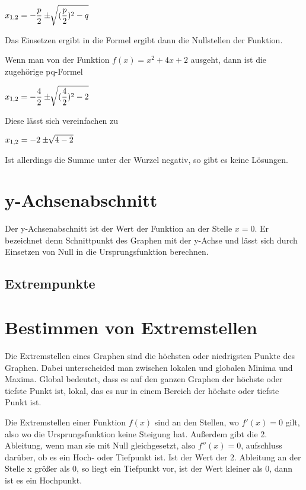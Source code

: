 $\mathlarger{x_{1,2} = -\frac{p}{2} \pm \sqrt[]{(\frac{p}{2})^2 - q}}$ \newline

Das Einsetzen ergibt in die Formel ergibt dann die Nullstellen der Funktion.

Wenn man von der Funktion $f(x) = x^2 + 4x + 2$ ausgeht, dann ist die zugehörige pq-Formel \newline

$\mathlarger{x_{1,2} = -\frac{4}{2} \pm \sqrt[]{(\frac{4}{2})^2 - 2}}$ \newline

Diese lässt sich vereinfachen zu \newline

$\mathlarger{x_{1,2} = -2 \pm \sqrt[]{4 - 2}}$

Ist allerdings die Summe unter der Wurzel negativ, so gibt es keine Lösungen.

\section*{y-Achsenabschnitt}

Der y-Achsenabschnitt ist der Wert der Funktion an der Stelle $x = 0$.
Er bezeichnet denn Schnittpunkt des Graphen mit der y-Achse und lässt sich
durch Einsetzen von Null in die Ursprungsfunktion berechnen. 

\subsection{Extrempunkte}

\section*{Bestimmen von Extremstellen}
Die Extremstellen eines Graphen sind die höchsten oder niedrigsten Punkte des Graphen.
Dabei unterscheided man zwischen lokalen und globalen Minima und Maxima. Global bedeutet,
dass es auf den ganzen Graphen der höchste oder tiefste Punkt ist, lokal, das es nur in einem Bereich
der höchste oder tiefste Punkt ist.
\newline

Die Extremstellen einer Funktion $f(x)$ sind an den Stellen, wo $f'(x) = 0$ gilt, also wo
die Ursprungsfunktion keine Steigung hat. Außerdem gibt die 2. Ableitung, wenn man sie mit Null
gleichgesetzt, also $f''(x) = 0$, aufschluss darüber, ob es ein Hoch- oder Tiefpunkt ist.
Ist der Wert der 2. Ableitung an der Stelle x größer als $0$, so liegt ein Tiefpunkt vor, ist der Wert kleiner
als $0$, dann ist es ein Hochpunkt.
\newline

